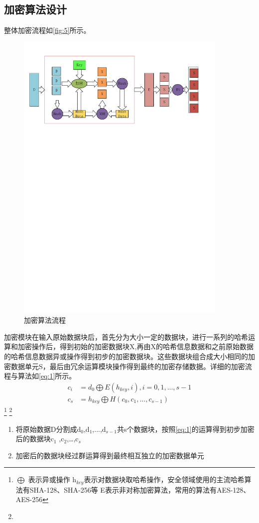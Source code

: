 \subsection{加密算法设计}
整体加密流程如\autoref{fig:5}所示。
\begin{figure}[H]
	\centering
	\includegraphics[width=4in]{Pics/encrypt.pdf}
	\caption{加密算法流程}\label{fig:5}
\end{figure}
加密模块在输入原始数据块后，首先分为大小一定的数据块，进行一系列的哈希运算和加密操作后，得到初始的加密数据块X,再由X的哈希信息数据和之前原始数据的哈希信息数据异或操作得到初步的加密数据块。这些数据块组合成大小相同的加密数据单元S，最后由冗余运算模块操作得到最终的加密存储数据。详细的加密流程与算法如\autoref{eq:1}所示。
\begin{equation}
    \label{eq:1}
    \begin{aligned}
        c_{i} &=d_{0} \bigoplus E(h_{key},i),i=0,1,...,s-1 \\ %
        c_{s} &=h_{key} \bigoplus H(c_0,c_1,...,c_{s-1})     
    \end{aligned}
\end{equation}
\footnote{$\bigoplus$ 表示异或操作
\newline h$_{key}$表示对数据块取哈希操作，安全领域使用的主流哈希算法有SHA-128、SHA-256等
\newline E表示非对称加密算法，常用的算法有AES-128、AES-256
}
\footnote{}
\begin{enumerate}
    \item 将原始数据D分割成d$_{0}$,d$_{1}$,...,d$_{s-1}$共s个数据块，按照\autoref{eq:1}的运算得到初步加密后的数据块c$_{1}$ ,c$_{2}$,…,c$_{s}$
	\item 加密后的数据块经过群运算得到最终相互独立的加密数据单元
\end{enumerate}

